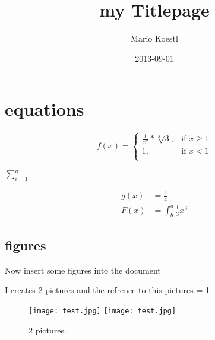 \documentclass{article}
\title{my Titlepage}
\date{2013-09-01}
\author{Mario Koestl}
\begin{document}
\maketitle
\newpage
{} %

\section{equations}

\begin{equation}
f(x) = 
\begin{cases}
\frac{1}{x^2} * \sqrt[8]{3},& \text{if } x\geq 1\\
1, & \text{if } x < 1\\
\end{cases}
\end{equation}

$\sum^n_{i=1}$

\begin{align*}
  g(x) &= \frac{1}{x}\\
  F(x) &= \int^a_b \frac{1}{3}x^3
\end{align*}


\subsection{figures}
Now insert some figures into the document

I creates 2 pictures and the refrence to this pictures = \ref{fig:2pictures}


\begin{figure}[b] 
 
  \texttt{[image: test.jpg]}
  \texttt{[image: test.jpg]}
  \caption{2 pictures.}
  \label{fig:2pictures}
\end{figure}

\FloatBarrier %
\end{document}
